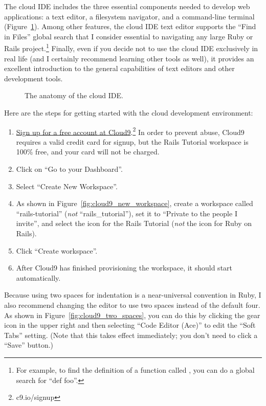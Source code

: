 The cloud IDE includes the three essential components needed to develop web applications: a text editor, a filesystem navigator, and a command-line terminal (Figure~\ref{fig:ide_anatomy}). Among other features, the cloud IDE text editor supports the ``Find in Files'' global search that I consider essential to navigating any large Ruby or Rails project.\footnote{For example, to find the definition of a function called , you can do a global search for ``def foo''.} Finally, even if you decide not to use the cloud IDE exclusively in real life (and I certainly recommend learning other tools as well), it provides an excellent introduction to the general capabilities of text editors and other development tools.

\begin{figure}
\begin{center}
\end{center}
\caption{The anatomy of the cloud IDE.\label{fig:ide_anatomy}}
\end{figure}

Here are the steps for getting started with the cloud development environment:
\begin{enumerate}
\item \href{https://c9.io/web/sign-up/free}{Sign up for a free account at Cloud9}.\footnote{c9.io/signup} In order to prevent abuse, Cloud9 requires a valid credit card for signup, but the Rails Tutorial workspace is 100\% free, and your card will not be charged.
\item Click on ``Go to your Dashboard''.
\item Select ``Create New Workspace''.
\item As shown in Figure~\ref{fig:cloud9_new_workspace}, create a workspace called ``rails-tutorial'' (\emph{not} ``rails\_tutorial''), set it to ``Private to the people I invite'', and select the icon for the Rails Tutorial (\emph{not} the icon for Ruby on Rails).
\item Click ``Create workspace''.
\item After Cloud9 has finished provisioning the workspace, it should start automatically.
\end{enumerate}
Because using two spaces for indentation is a near-universal convention in Ruby, I also recommend changing the editor to use two spaces instead of the default four. As shown in Figure~\ref{fig:cloud9_two_spaces}, you can do this by clicking the gear icon in the upper right and then selecting ``Code Editor (Ace)'' to edit the ``Soft Tabs'' setting. (Note that this takes effect immediately; you don't need to click a ``Save'' button.)

